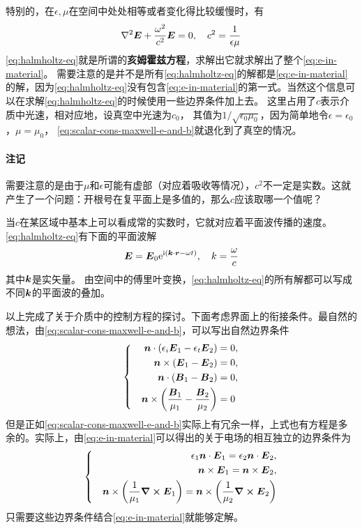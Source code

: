 \documentclass[UTF8, a4paper]{ctexart}
\newcommand*{\comment}{\paragraph{注记}}
\newcommand*{\ii}{\mathrm{i}}
\newcommand*{\ee}{\mathrm{e}}
\newenvironment{bigcase}{\left\{\quad\begin{aligned}}{\end{aligned}\right.}
\begin{document}
特别的，在$\epsilon, \mu$在空间中处处相等或者变化得比较缓慢时，有
\begin{equation}
    \laplacian \vb*{E} + \frac{\omega^2}{c^2} \vb*{E} = 0, \quad c^2 = \frac{1}{\epsilon \mu}
    \label{eq:halmholtz-eq}
\end{equation}
\eqref{eq:halmholtz-eq}就是所谓的\textbf{亥姆霍兹方程}，求解出它就求解出了整个\eqref{eq:e-in-material}。
需要注意的是并不是所有\eqref{eq:halmholtz-eq}的解都是\eqref{eq:e-in-material}的解，因为\eqref{eq:halmholtz-eq}没有包含\eqref{eq:e-in-material}的第一式。当然这个信息可以在求解\eqref{eq:halmholtz-eq}的时候使用一些边界条件加上去。
这里占用了$c$表示介质中光速，相对应地，设真空中光速为$c_0$，
其值为$1/\sqrt{\epsilon_0 \mu_0}$，因为简单地令$\epsilon=\epsilon_0$，$\mu = \mu_0$，
\eqref{eq:scalar-cons-maxwell-e-and-b}就退化到了真空的情况。

\comment 需要注意的是由于$\mu$和$\epsilon$可能有虚部（对应着吸收等情况），$c^2$不一定是实数。这就产生了一个问题：开根号在复平面上是多值的，那么$c$应该取哪一个值呢？

当$c$在某区域中基本上可以看成常的实数时，它就对应着平面波传播的速度。\eqref{eq:halmholtz-eq}有下面的平面波解
\begin{equation}
    \vb*{E} = \vb*{E}_0 \ee^{\ii(\vb*{k} \cdot \vb*{r} - \omega t)}, \quad k = \frac{\omega}{c}
    \label{eq:plane-wave}
\end{equation}
其中$\vb*{k}$是实矢量。
由空间中的傅里叶变换，\eqref{eq:halmholtz-eq}的所有解都可以写成不同$\vb*{k}$的平面波的叠加。

以上完成了关于介质中的控制方程的探讨。下面考虑界面上的衔接条件。最自然的想法，由\eqref{eq:scalar-cons-maxwell-e-and-b}，可以写出自然边界条件
\[
    \begin{bigcase}
        \vb*{n} \cdot (\epsilon_i \vb*{E}_1 - \epsilon_t \vb*{E}_2) &= 0, \\
        \vb*{n} \times (\vb*{E}_1 - \vb*{E}_2) &= 0, \\
        \vb*{n} \cdot (\vb*{B}_1 - \vb*{B}_2) &= 0, \\
        \vb*{n} \times \left( \frac{\vb*{B}_1}{\mu_1} - \frac{\vb*{B}_2}{\mu_2} \right) &= 0
    \end{bigcase}
\]
但是正如\eqref{eq:scalar-cons-maxwell-e-and-b}实际上有冗余一样，上式也有方程是多余的。实际上，由\eqref{eq:e-in-material}可以得出的关于电场的相互独立的边界条件为
\begin{equation}
    \left\{\quad
        \begin{aligned}
            \epsilon_1 \vb*{n} \cdot \vb*{E}_1 = \epsilon_2 \vb*{n} \cdot \vb*{E}_2, \\
            \vb*{n} \times \vb*{E}_1 = \vb*{n} \times \vb*{E}_2, \\
            \vb*{n} \times \left( \frac{1}{\mu_1} \curl{\vb*{E}_1} \right) = \vb*{n} \times \left(\frac{1}{\mu_2} \curl{\vb*{E}_2} \right)
        \end{aligned}
    \right.
    \label{eq:e-bound-condition}
\end{equation}
只需要这些边界条件结合\eqref{eq:e-in-material}就能够定解。
\end{document}

